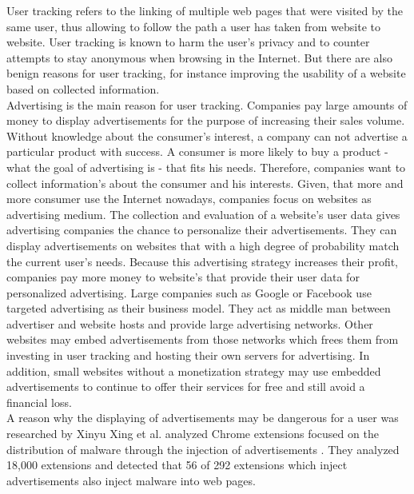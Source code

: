 			User tracking refers to the linking of multiple web pages that were visited by the same user, thus allowing to follow the path a user has taken from website to website. User tracking is known to harm the user's privacy and to counter attempts to stay anonymous when browsing in the Internet. %
			But there are also benign reasons for user tracking, for instance improving the usability of a website based on collected information. \\ 
			
			Advertising is the main reason for user tracking. Companies pay large amounts of money to display advertisements for the purpose of increasing their sales volume. Without knowledge about the consumer's interest, a company can not advertise a particular product with success. A consumer is more likely to buy a product - what the goal of advertising is - that fits his needs. Therefore, companies want to collect information's about the consumer and his interests. Given, that more and more consumer use the Internet nowadays, companies focus on websites as advertising medium. The collection and evaluation of a website's user data gives advertising companies the chance to personalize their advertisements. They can display advertisements on websites that with a high degree of probability match the current user's needs. Because this advertising strategy increases their profit, companies pay more money to website's that provide their user data for personalized advertising. Large companies such as Google or Facebook use targeted advertising as their business model. They act as middle man between advertiser and website hosts and provide large advertising networks. Other websites may embed advertisements from those networks which frees them from investing in user tracking and hosting their own servers for advertising. In addition, small websites without a monetization strategy may use embedded advertisements to continue to offer their services for free and still avoid a financial loss. \\
			
			A reason why the displaying of advertisements may be dangerous for a user was researched by Xinyu Xing et al. analyzed Chrome extensions focused on the distribution of malware through the injection of advertisements \cite{Xing:2015:UMT:2736277.2741630}. They analyzed 18,000 extensions and detected that 56 of 292 extensions which inject advertisements also inject malware into web pages. %
			\\
			
